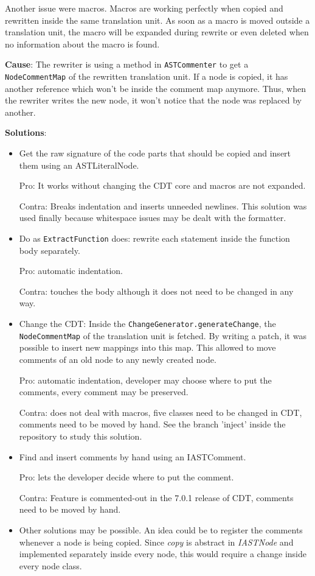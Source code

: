 Another issue were macros. Macros are working perfectly when copied and 
rewritten inside the same translation unit. As soon as a macro is moved outside 
a translation unit, the macro will be expanded during rewrite or even
deleted when no information about the macro is found.

\textbf{Cause}: The rewriter is using a method in \texttt{ASTCommenter} to get a 
\texttt{NodeCommentMap} of the rewritten translation unit. If a node is copied, 
it has another reference which won't be inside the comment map anymore. Thus, 
when the rewriter writes the new node, it won't notice that the node was 
replaced by another.

\textbf{Solutions}:
\begin{itemize}
\item Get the raw signature of the code parts that should be copied and insert 
them using an ASTLiteralNode. 

Pro: It works without changing the CDT core and macros are not expanded. 

Contra: Breaks indentation and inserts unneeded newlines. This solution was used 
finally because whitespace issues may be dealt with the formatter.
\item Do as \texttt{ExtractFunction} does: rewrite each statement inside the 
function body separately. 

Pro: automatic indentation. 

Contra: touches the body although it does not need to be changed in any way. 
\item Change the CDT: Inside the \texttt{ChangeGenerator.generateChange}, the 
\texttt{NodeCommentMap} of the translation unit is fetched. By writing a patch, 
it was possible to insert new mappings into this map. This allowed to move 
comments of an old node to any newly created node. 

Pro: automatic indentation, developer may choose where to put the comments, 
every comment may be preserved. 

Contra: does not deal with macros, five classes need to be changed in CDT, 
comments need to be moved by hand. See the branch 'inject' inside the repository 
to study this solution.
\item Find and insert comments by hand using an IASTComment. 

Pro: lets the developer decide where to put the comment. 

Contra: Feature is commented-out in the 7.0.1 release of CDT, comments need to 
be moved by hand.
\item Other solutions may be possible. An idea could be to register the comments 
whenever a node is being copied. Since \textit{copy} is abstract in 
\textit{IASTNode} and implemented separately inside every node, this would 
require a change inside every node class.
\end{itemize}


